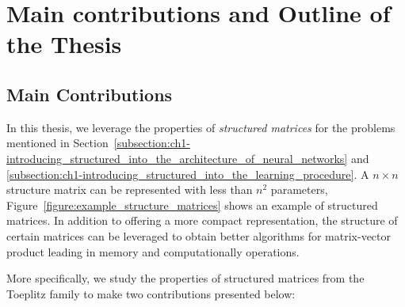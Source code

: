 %
%
%
%
%
%
%




\section{Main contributions and Outline of the Thesis}
\label{section:ch1-main_contributions_and_outline_of_the_thesis}

\subsection{Main Contributions}
\label{subsection:ch1-main_contributions}

In this thesis, we leverage the properties of \emph{structured matrices} for the problems mentioned in Section~\ref{subsection:ch1-introducing_structured_into_the_architecture_of_neural_networks} and \ref{subsection:ch1-introducing_structured_into_the_learning_procedure}. A $n \times n$ structure matrix can be represented with less than $n^2$ parameters, Figure~\ref{figure:example_structure_matrices} shows an example of structured matrices.
In addition to offering a more compact representation, the structure of certain matrices can be leveraged to obtain better algorithms for matrix-vector product leading in memory and computationally operations. 


More specifically, we study the properties of structured matrices from the Toeplitz family to make two contributions presented below:

